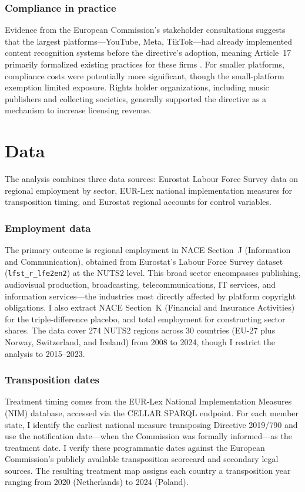 \documentclass[12pt]{article}
\begin{document}
\subsubsection*{Compliance in practice} Evidence from the European Commission's stakeholder consultations suggests that the largest platforms---YouTube, Meta, TikTok---had already implemented content recognition systems before the directive's adoption, meaning Article~17 primarily formalized existing practices for these firms \citep{peukert2022european}. For smaller platforms, compliance costs were potentially more significant, though the small-platform exemption limited exposure. Rights holder organizations, including music publishers and collecting societies, generally supported the directive as a mechanism to increase licensing revenue.


\section{Data}

The analysis combines three data sources: Eurostat Labour Force Survey data on regional employment by sector, EUR-Lex national implementation measures for transposition timing, and Eurostat regional accounts for control variables.

\subsubsection*{Employment data} The primary outcome is regional employment in NACE Section~J (Information and Communication), obtained from Eurostat's Labour Force Survey dataset (\texttt{lfst\_r\_lfe2en2}) at the NUTS2 level. This broad sector encompasses publishing, audiovisual production, broadcasting, telecommunications, IT services, and information services---the industries most directly affected by platform copyright obligations. I also extract NACE Section~K (Financial and Insurance Activities) for the triple-difference placebo, and total employment for constructing sector shares. The data cover 274 NUTS2 regions across 30 countries (EU-27 plus Norway, Switzerland, and Iceland) from 2008 to 2024, though I restrict the analysis to 2015--2023.

\subsubsection*{Transposition dates} Treatment timing comes from the EUR-Lex National Implementation Measures (NIM) database, accessed via the CELLAR SPARQL endpoint. For each member state, I identify the earliest national measure transposing Directive 2019/790 and use the notification date---when the Commission was formally informed---as the treatment date. I verify these programmatic dates against the European Commission's publicly available transposition scorecard and secondary legal sources. The resulting treatment map assigns each country a transposition year ranging from 2020 (Netherlands) to 2024 (Poland).
\end{document}

